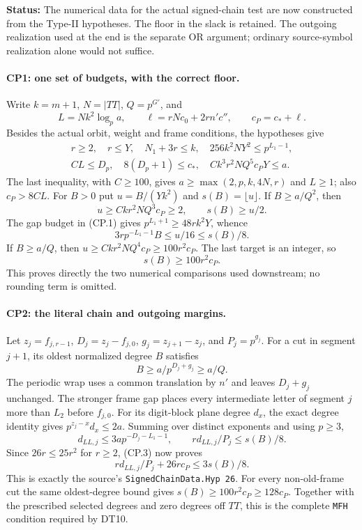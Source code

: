 \documentclass[11pt,a4paper]{article}
\numberwithin{equation}{section}
\theoremstyle{remark}\newtheorem{remark}[theorem]{Remark}
\newcommand{\status}[1]{\textbf{Status:} #1}
\begin{document}
\status{The numerical data for the actual signed-chain test are now
constructed from the Type-II hypotheses. The floor in the slack is retained.
The outgoing realization used at the end is the separate OR argument;
ordinary source-symbol realization alone would not suffice.}

\paragraph{CP1: one set of budgets, with the correct floor.}
Write $k=m+1$, $N=|TT|$, $Q=p^{G'}$, and
\[
 L=Nk^2\log_p a,\qquad
 \ell=rNc_0+2rn'c'',\qquad c_P=c_*+\ell.
\]
Besides the actual orbit, weight and frame conditions, the hypotheses give
\[
\begin{gathered}
 r\ge2,\quad r\le Y,\quad N_1+3r\le k,\quad
 256k^2NY^2\le p^{L_1-1},\\
 CL\le D_p,\quad 8(D_p+1)\le c_*,\quad
 Ck^3r^2NQ^5c_PY\le a .
\end{gathered}                                                     \tag{CP.1}
\]
The last inequality, with $C\ge100$, gives
$a\ge\max(2,p,k,4N,r)$ and $L\ge1$; also $c_P>8CL$.
For $B>0$ put $u=B/(Yk^2)$ and $s(B)=\lfloor u\rfloor$.
If $B\ge a/Q^2$, then
\[
 u\ge Ckr^2NQ^3c_P\ge2,\qquad s(B)\ge u/2.
\]
The gap budget in (CP.1) gives
$p^{L_1+1}\ge48rk^2Y$, whence
\[
 3rp^{-L_1-1}B\le u/16\le s(B)/8.                     \tag{CP.2}
\]
If $B\ge a/Q$, then $u\ge Ckr^2NQ^4c_P\ge100r^2c_P$.
The last target is an integer, so
\[
                         s(B)\ge100r^2c_P.            \tag{CP.3}
\]
This proves directly the two numerical comparisons used downstream;
no rounding term is omitted.

\paragraph{CP2: the literal chain and outgoing margins.}
Let $z_j=f_{j,r-1}$, $D_j=z_j-f_{j,0}$,
$g_j=z_{j+1}-z_j$, and $P_j=p^{g_j}$.
For a cut in segment $j+1$, its oldest normalized degree $B$ satisfies
\[
 B\ge a/p^{D_j+g_j}\ge a/Q.
\]
The periodic wrap uses a common translation by $n'$ and leaves
$D_j+g_j$ unchanged. The stronger frame gap places every intermediate
letter of segment $j$ more than $L_2$ before $f_{j,0}$.
For its digit-block plane degree $d_x$, the exact degree identity gives
$p^{z_j-x}d_x\le2a$. Summing over distinct exponents and using $p\ge3$,
\[
 d_{LL,j}\le3ap^{-D_j-L_1-1},\qquad
 r d_{LL,j}/P_j\le s(B)/8.
\]
Since $26r\le25r^2$ for $r\ge2$, (CP.3) now proves
\[
 r d_{LL,j}/P_j+26rc_P\le3s(B)/8.                      \tag{CP.4}
\]
This is exactly the source's \texttt{SignedChainData.Hyp 26}.
For every non-old-frame cut the same oldest-degree bound gives
$s(B)\ge100r^2c_P\ge128c_P$. Together with the prescribed selected
degrees and zero degrees off $TT$, this is the complete
\texttt{MFH} condition required by DT10.
\end{document}
